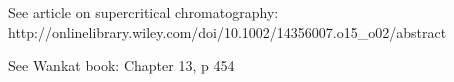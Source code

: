 See article on supercritical chromatography: http://onlinelibrary.wiley.com/doi/10.1002/14356007.o15_o02/abstract

See Wankat book: Chapter 13, p 454